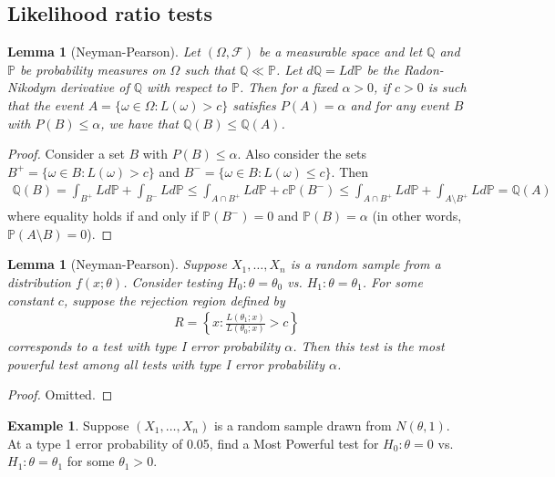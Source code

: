 \documentclass[11pt]{amsart}
\newtheorem{lemma}[theorem]{Lemma}
\theoremstyle{definition}
\newtheorem{example}[theorem]{Example}
\numberwithin{equation}{section}
\begin{document}
\subsection{Likelihood ratio tests}
\begin{lemma}[Neyman-Pearson]
    Let $(\Omega,\mathcal F)$ be a measurable space and let $\mathbb Q$ and $\mathbb P$ be probability measures on $\Omega$ such that $\mathbb Q\ll\mathbb P$. Let $d\mathbb Q=Ld\mathbb P$ be the Radon-Nikodym derivative of $\mathbb Q$ with respect to $\mathbb P$. Then for a fixed $\alpha>0$, if $c>0$ is such that the event $A=\{\omega\in \Omega:L(\omega)>c\}$ satisfies $P(A)=\alpha$ and for any event $B$ with $P(B)\le\alpha$, we have that $\mathbb Q(B)\le\mathbb Q(A)$.
\end{lemma}
\begin{proof}
    Consider a set $B$ with $P(B)\le\alpha$. Also consider the sets $B^+=\{\omega\in B:L(\omega)>c\}$ and $B^-=\{\omega\in B:L(\omega)\le c\}$. Then
    \begin{align*}
        \mathbb Q(B)=\int_{B^+}Ld\mathbb P+\int_{B^-}Ld\mathbb P\le\int_{A\cap B^+} Ld\mathbb P+c\mathbb P(B^-)\le \int_{A\cap B^+}Ld\mathbb P+\int_{A\setminus B^+}Ld\mathbb P=\mathbb Q(A)
    \end{align*}
    where equality holds if and only if $\mathbb P(B^-)=0$ and $\mathbb P(B)=\alpha$ (in other words, $\mathbb P(A\setminus B)=0$).
\end{proof}
\begin{lemma}[Neyman-Pearson]
    Suppose $X_1,\ldots,X_n$ is a random sample from a distribution $f(x;\theta)$. Consider testing $H_0:\theta=\theta_0$ vs. $H_1:\theta=\theta_1$. For some constant $c$, suppose the rejection region defined by 
    \begin{align*}
        R=\left\{x:\frac{L(\theta_1;x)}{L(\theta_0;x)}>c\right\}
    \end{align*}
    corresponds to a test with type I error probability $\alpha$. Then this test is the most powerful test among all tests with type I error probability $\alpha$.
\end{lemma}
\begin{proof}
    Omitted.
\end{proof}
\begin{example}
    Suppose $(X_1,\ldots,X_n)$ is a random sample drawn from $N(\theta,1)$. At a type 1 error probability of 0.05, find a Most Powerful test for $H_0:\theta=0$ vs. $H_1:\theta=\theta_1$ for some $\theta_1>0$.
\end{example}
\end{document}
